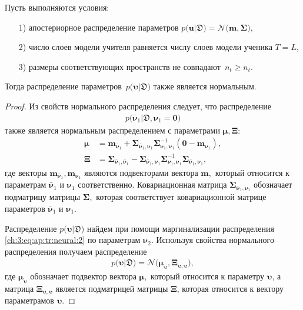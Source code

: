\begin{theorem}
Пусть выполняются условия:
\begin{enumerate}
\item[1)] апостериорное распределение параметров $p\bigr(\mathbf{u}|\mathfrak{D}\bigr) = \mathcal{N}\bigr(\mathbf{m}, \bm{\Sigma}\bigr),$
\item[2)] число слоев модели учителя равняется числу слоев модели ученика $T=L$,
\item[3)] размеры соответствующих пространств не совпадают~$n_t \geq n_t.$
\end{enumerate}
Тогда распределение параметров~$p\bigr(\bm{\upsilon}|\mathfrak{D}\bigr)$ также является нормальным.
\end{theorem}
\begin{proof}
Из свойств нормального распределения следует, что распределение
\[
\begin{aligned}
p\bigr(\bar{\bm{\nu}}_1|\mathfrak{D}, \bm{\nu}_1=\mathbf{0}\bigr)
\end{aligned}
\]
также является нормальным распределением с параметрами $\bm{\mu}, \bm{\Xi}$:
\[
\begin{aligned}
\bm{\mu} &= \mathbf{m}_{\bar{\bm{\nu}}_1}+\bm{\Sigma}_{\bar{\bm{\nu}}_1,\bm{\nu}_1} \bm{\Sigma}_{\bm{\nu}_1,\bm{\nu}_1}^{-1} \left(\mathbf{0} - \mathbf{m}_{\bm{\nu}_1}\right), \\
 \bm{\Xi} &= \bm{\Sigma}_{\bar{\bm{\nu}}_1,\bar{\bm{\nu}}_1} - \bm{\Sigma}_{\bar{\bm{\nu}}_1,\bm{\nu}_1} \bm{\Sigma}_{\bm{\nu}_1,\bm{\nu}_1}^{-1} \bm{\Sigma}_{\bar{\bm{\nu}}_1,\bm{\nu}_1},
\end{aligned}
\]
где векторы $\mathbf{m}_{\bar{\bm{\nu}}_1}, \mathbf{m}_{\bm{\nu}_1}$ являются подвекторами вектора $\mathbf{m},$ который относится к параметрам $\bar{\bm{\nu}}_1$ и $\bm{\nu}_1$ соответственно. Ковариационная матрица $\bm{\Sigma}_{\bar{\bm{\nu}}_1,\bm{\nu}_1}$ обозначает подматрицу матрицы $\bm{\Sigma},$ которая соответствует ковариационной матрице параметров $\bar{\bm{\nu}}_1$ и $\bm{\nu}_1.$

Распределение $p\bigr(\bm{\upsilon}|\mathfrak{D}\bigr)$ найдем при помощи маргинализации распределения \eqref{ch:3:eq:ap:tr:neural:2} по параметрам $\bm{\nu}_2.$ Используя свойства нормального распределения получаем распределение
\[
\begin{aligned}
p\bigr(\bm{\upsilon}|\mathfrak{D}\bigr) = \mathcal{N}\bigr(\bm{\mu}_{\bm{\upsilon}},  \bm{\Xi}_{\bm{\upsilon}, \bm{\upsilon}}\bigr),
\end{aligned}
\]
где $\bm{\mu}_{\bm{\upsilon}}$ обозначает подвектор вектора $\bm{\mu},$ который относится к параметру $\bm{\upsilon}$, а матрица $\bm{\Xi}_{\bm{\upsilon}, \bm{\upsilon}}$ является подматрицей матрицы $\bm{\Xi}$, которая относится к вектору параметрамов $\bm{\upsilon}.$
\end{proof}

